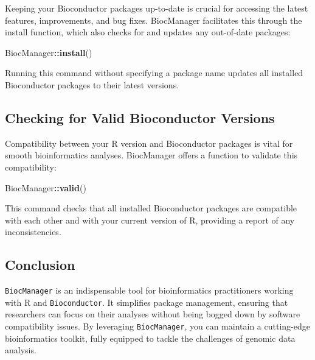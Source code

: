 \documentclass[
]{book}
\newenvironment{Shaded}{\begin{snugshade}}{\end{snugshade}}
\newcommand{\FunctionTok}[1]{\textcolor[rgb]{0.13,0.29,0.53}{\textbf{#1}}}
\newcommand{\NormalTok}[1]{#1}
\newcommand{\SpecialCharTok}[1]{\textcolor[rgb]{0.81,0.36,0.00}{\textbf{#1}}}
\begin{document}
Keeping your Bioconductor packages up-to-date is crucial for accessing the latest features, improvements, and bug fixes. BiocManager facilitates this through the install function, which also checks for and updates any out-of-date packages:

\begin{Shaded}
\begin{Highlighting}[]
\NormalTok{BiocManager}\SpecialCharTok{::}\FunctionTok{install}\NormalTok{()}
\end{Highlighting}
\end{Shaded}

Running this command without specifying a package name updates all installed Bioconductor packages to their latest versions.

\hypertarget{checking-for-valid-bioconductor-versions}{%
\subsection{Checking for Valid Bioconductor Versions}\label{checking-for-valid-bioconductor-versions}}

Compatibility between your R version and Bioconductor packages is vital for smooth bioinformatics analyses. BiocManager offers a function to validate this compatibility:

\begin{Shaded}
\begin{Highlighting}[]
\NormalTok{BiocManager}\SpecialCharTok{::}\FunctionTok{valid}\NormalTok{()}
\end{Highlighting}
\end{Shaded}

This command checks that all installed Bioconductor packages are compatible with each other and with your current version of R, providing a report of any inconsistencies.

\hypertarget{conclusion-26}{%
\subsection{Conclusion}\label{conclusion-26}}

\texttt{BiocManager} is an indispensable tool for bioinformatics practitioners working with R and \texttt{Bioconductor}. It simplifies package management, ensuring that researchers can focus on their analyses without being bogged down by software compatibility issues. By leveraging \texttt{BiocManager}, you can maintain a cutting-edge bioinformatics toolkit, fully equipped to tackle the challenges of genomic data analysis.

  
\end{document}
